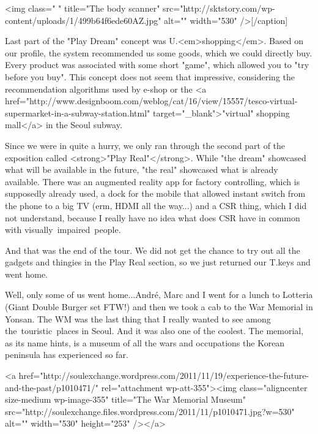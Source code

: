 \begin{post}
\begin{content}
[caption id="" align="aligncenter" width="530" caption="The 3D full body scanner"]<img class=" " title="The body scanner" src="http://sktstory.com/wp-content/uploads/1/499b64f6ede60AZ.jpg" alt="" width="530" />[/caption]

Last part of the "Play Dream" concept was U.<em>shopping</em>. Based on our profile, the system recommended us some goods, which we could directly buy. Every product was associated with some short "game", which allowed you to "try before you buy". This concept does not seem that impressive, considering the recommendation algorithms used by e-shop or the <a href="http://www.designboom.com/weblog/cat/16/view/15557/tesco-virtual-supermarket-in-a-subway-station.html" target="_blank">"virtual" shopping mall</a> in the Seoul subway.

Since we were in quite a hurry, we only ran through the second part of the exposition called <strong>"Play Real"</strong>. While "the dream" showcased what will be available in the future, "the real" showcased what is already available. There was an augmented reality app for factory controlling, which is supposedly already used, a dock for the mobile that allowed instant switch from the phone to a big TV (erm, HDMI all the way...) and a CSR thing, which I did not understand, because I really have no idea what does CSR have in common with visually impaired people.

And that was the end of the tour. We did not get the chance to try out all the gadgets and thingies in the Play Real section, so we just returned our T.keys and went home.

Well, only some of us went home...André, Marc and I went for a lunch to Lotteria (Giant Double Burger set FTW!) and then we took a cab to the War Memorial in Yonsan. The WM was the last thing that I really wanted to see among the touristic places in Seoul. And it was also one of the coolest. The memorial, as its name hints, is a museum of all the wars and occupations the Korean peninsula has experienced so far.

<a href="http://soulexchange.wordpress.com/2011/11/19/experience-the-future-and-the-past/p1010471/" rel="attachment wp-att-355"><img class="aligncenter size-medium wp-image-355" title="The War Memorial Museum" src="http://soulexchange.files.wordpress.com/2011/11/p1010471.jpg?w=530" alt="" width="530" height="253" /></a>


\end{content}
\end{post}
